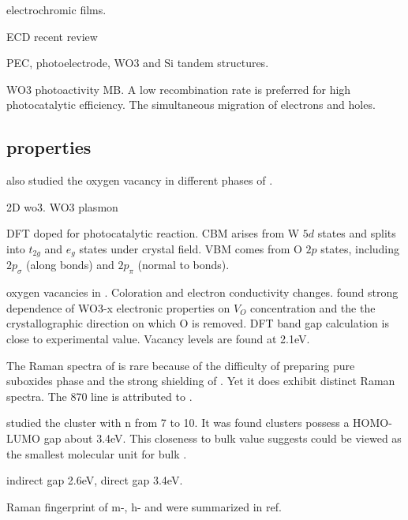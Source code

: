 electrochromic films. \cite{Yoshimura1985}

ECD \cite{Jiao2012} recent review \cite{Mortimer2011}

PEC, photoelectrode, WO3 and Si tandem structures.\cite{Coridan2013}

WO3 photoactivity MB. \cite{Watcharenwong2008}
A low recombination rate is preferred for high photocatalytic efficiency. The simultaneous migration of electrons and holes.



\subsection{properties}

\citeauthor{Chatten2005} also studied the oxygen vacancy in different phases of .\cite{Chatten2005}

2D wo3.\cite{Kalantar-zadeh2010a} 
WO3 plasmon \cite{Manthiram2012}

DFT doped  for photocatalytic reaction.\cite{Wang2012} CBM arises from W $5d$ states and splits into $t_{2g}$ and $e_g$ states under crystal field. VBM comes from O $2p$ states, including $2p_\sigma$ (along  bonds) and $2p_\pi$ (normal to  bonds).


oxygen vacancies in .\cite{Wang2011b}  Coloration and electron conductivity changes. \citeauthor{Wang2011b} found strong dependence of WO3-x electronic properties on $V_O$ concentration and the the crystallographic direction on which O is removed. DFT band gap calculation is close to experimental value. Vacancy levels are found at 2.1eV.

The Raman spectra of  is rare because of the difficulty of preparing pure suboxides phase and the strong shielding of . Yet it does exhibit distinct Raman spectra. \cite{Tenne2005} The 870 line is attributed to .\cite{Hardcastle1995}


\citeauthor{Huang2006} studied the  cluster with n from 7 to 10.\cite{Huang2006} It was found  clusters possess a HOMO-LUMO gap about 3.4eV. This closeness to bulk value suggests  could be viewed as the smallest molecular unit for bulk .


 indirect gap 2.6eV, direct gap 3.4eV. \cite{Koffyberg1979}

Raman fingerprint of m-, h- and  were summarized in ref\cite{Daniel1987}.

